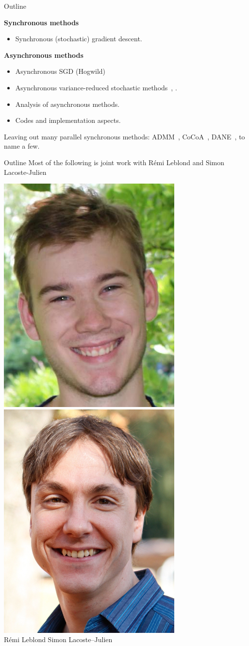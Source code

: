 \documentclass[10pt]{beamer}
\let\oldparencite=\parencite
\renewcommand{\parencite}[1]{\textcolor[rgb]{1.,.9,.9}{\oldparencite{#1}}}
\begin{document}
\begin{frame}{Outline}

{\centering \bfseries Synchronous methods}
\begin{itemize}
\item Synchronous (stochastic) gradient descent.
\end{itemize}
{\centering \bfseries Asynchronous methods}
\begin{itemize}
\item Asynchronous SGD (Hogwild)~\parencite{hogwild2011}
\item Asynchronous variance-reduced stochastic methods~\parencite{leblond2016Asaga}, \parencite{pedregosa2017proxasaga}.
\item Analysis of asynchronous methods. 
\item Codes and implementation aspects.
\end{itemize}

Leaving out many parallel synchronous methods: ADMM~\parencite{glowinski1975approximation}, CoCoA~\parencite{NIPS2014_5599}, DANE~\parencite{shamir2014communication}, to name a few.

\end{frame}

\begin{frame}{Outline}
Most of the following is joint work with Rémi Leblond and Simon Lacoste-Julien

{
\hspace{4.8em}\includegraphics[width=0.2\linewidth]{img/remi}
\hspace{4.8em}\includegraphics[width=0.2\linewidth]{img/SLJ}
}\\
{\normalsize\vphantom{}
\hspace{4em} R\'emi Leblond \hspace{3em} Simon Lacoste--Julien}\\

\end{frame}
\end{document}
